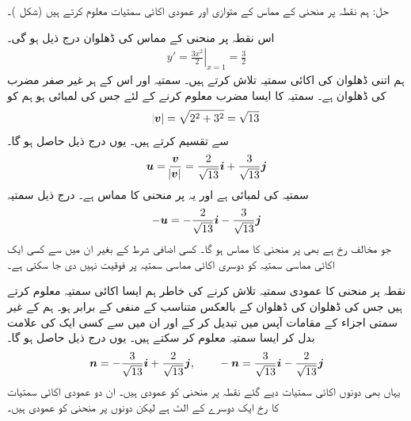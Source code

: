 حل:\quad
ہم نقطہ  پر منحنی کے مماس کے متوازی اور عمودی اکائی سمتیات معلوم کرتے ہیں (شکل )۔

اس نقطہ پر منحنی کے مماس کی ڈھلوان درج ذیل ہو گی۔
\begin{align*}
y'=\left.\frac{3x^2}{2}\right\vert_{x=1}=\frac{3}{2}
\end{align*}
ہم اتنی ڈھلوان کی اکائی سمتیہ تلاش کرتے ہیں۔ سمتیہ  اور اس کے ہر غیر صفر مضرب کی ڈھلوان  ہے۔ سمتیہ   کا ایسا مضرب معلوم کرنے کے لئے جس کی لمبائی  ہو ہم  کو 
\begin{align*}
\abs{{{\boldsymbol{v}}}}=\sqrt{2^2+3^2}=\sqrt{13}
\end{align*}
سے تقسیم کرتے ہیں۔ یوں درج ذیل حاصل ہو گا۔
\begin{align*}
{\ensuremath{{\boldsymbol{u}}}}=\frac{{{\boldsymbol{v}}}}{\abs{{{\boldsymbol{v}}}}}=\frac{2}{\sqrt{13}}{\boldsymbol{i}}+\frac{3}{\sqrt{13}}{\boldsymbol{j}}
\end{align*}
سمتیہ  کی لمبائی  ہے اور یہ  پر منحنی کا مماس ہے۔ درج ذیل سمتیہ
\begin{align*}
-{{\boldsymbol{u}}}=-\frac{2}{\sqrt{13}}{\boldsymbol{i}}-\frac{3}{\sqrt{13}}{\boldsymbol{j}}
\end{align*}
جو مخالف  رخ ہے بھی  پر منحنی کا مماس ہو گا۔ کسی اضافی شرط کے بغیر ان میں سے کسی ایک اکائی مماسی سمتیہ کو دوسری اکائی مماسی سمتیہ پر فوقیت نہیں دی جا سکتی ہے۔

نقطہ  پر منحنی کا عمودی سمتیہ تلاش کرنے کی خاطر ہم ایسا اکائی سمتیہ معلوم کرتے ہیں جس کی ڈھلوان  کی ڈھلوان کے بالعکس متناسب کے منفی کے برابر ہو۔ ہم  کے غیر سمتی اجزاء کے مقامات آپس میں تبدیل کر کے اور ان میں سے کسی ایک کی علامت بدل کر ایسا سمتیہ معلوم کر سکتے ہیں۔ یوں درج ذیل حاصل ہو گا۔
\begin{align*}
{\ensuremath{{\boldsymbol{n}}}}=-\frac{3}{\sqrt{13}}{\boldsymbol{i}}+\frac{2}{\sqrt{13}}{\boldsymbol{j}},\quad \text{}\quad -{{\boldsymbol{n}}}=\frac{3}{\sqrt{13}}{\boldsymbol{i}}-\frac{2}{\sqrt{13}}{\boldsymbol{j}}
\end{align*}  
یہاں بھی دونوں اکائی سمتیات دیے گئے نقطہ پر منحنی کو عمودی ہیں۔ ان دو عمودی اکائی سمتیات کا رخ ایک دوسرے کے الٹ ہے لیکن دونوں  پر منحنی کو عمودی ہیں۔


